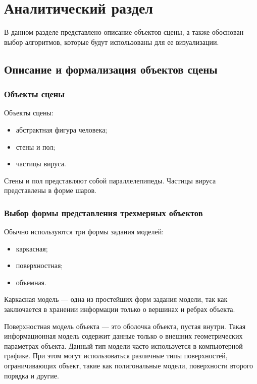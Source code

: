 \chapter{Аналитический раздел}
\label{cha:analysis}


В данном разделе представлено описание объектов сцены, а также обоснован выбор алгоритмов, которые будут использованы для ее визуализации.

\section{Описание и формализация объектов сцены}

\subsection{Объекты сцены}
Объекты сцены:
\begin{itemize}
	\item абстрактная фигура человека;
	\item стены и пол;
	\item частицы вируса.
\end{itemize}

Стены и пол представляют собой параллелепипеды. Частицы вируса представлены в форме шаров.

\subsection{Выбор формы представления трехмерных объектов}

Обычно используются три формы задания моделей:
\begin{itemize}
	\item каркасная;
	\item поверхностная;
	\item объемная.
\end{itemize}

Каркасная модель --- одна из простейших форм задания модели, так как заключается в хранении информации только о вершинах и ребрах объекта. 

Поверхностная модель объекта --- это оболочка объекта, пустая внутри. Такая информационная модель содержит данные только о внешних геометрических параметрах объекта. Данный тип модели часто используется в компьютерной графике. При этом могут использоваться различные типы поверхностей, ограничивающих объект, такие как полигональные модели, поверхности второго порядка и другие.

